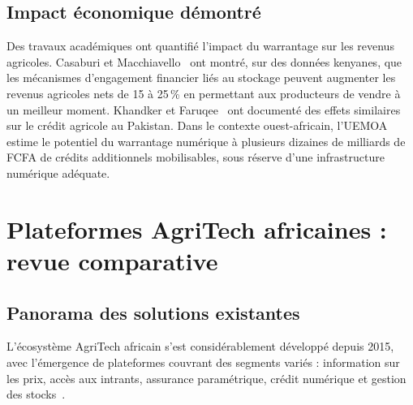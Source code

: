 \documentclass[12pt,a4paper,twoside]{report}
\begin{document}
\subsection{Impact économique démontré}

Des travaux académiques ont quantifié l'impact du warrantage sur les revenus
agricoles. Casaburi et Macchiavello~\cite{casaburi2019demand} ont montré, sur
des données kenyanes, que les mécanismes d'engagement financier liés au stockage
peuvent augmenter les revenus agricoles nets de 15 à 25\,\% en permettant aux
producteurs de vendre à un meilleur moment. Khandker et Faruqee~\cite{khandker2003impact}
ont documenté des effets similaires sur le crédit agricole au Pakistan. Dans le
contexte ouest-africain, l'UEMOA~\cite{uemoa2021financement} estime le potentiel
du warrantage numérique à plusieurs dizaines de milliards de FCFA de crédits
additionnels mobilisables, sous réserve d'une infrastructure numérique adéquate.

\section{Plateformes AgriTech africaines : revue comparative}

\subsection{Panorama des solutions existantes}

L'écosystème AgriTech africain s'est considérablement développé depuis 2015,
avec l'émergence de plateformes couvrant des segments variés : information sur
les prix, accès aux intrants, assurance paramétrique, crédit numérique et
gestion des stocks~\cite{bakhoum2021digital,fao2021ml}.
\end{document}
